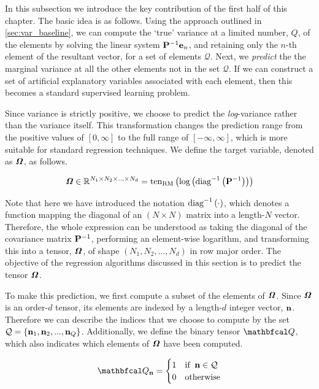 \label{sec:logvar_supervised}

In this subsection we introduce the key contribution of the first half of this chapter. The basic idea is as follows. Using the approach outlined in \cref{sec:var_baseline}, we can compute the `true' variance at a limited number, $Q$, of the elements by solving the linear system $\mathbf{P}^{-1}\mathbf{e}_n$, and retaining only the $n$-th element of the resultant vector, for a set of elements $\mathcal{Q}$. Next, we \textit{predict} the the marginal variance at all the other elements not in the set $\mathcal{Q}$. If we can construct a set of artificial explanatory variables associated with each element, then this becomes a standard supervised learning problem. 

Since variance is strictly positive, we choose to predict the \textit{log}-variance rather than the variance itself. This transformation changes the prediction range from the positive values of $[0, \infty]$ to the full range of $[-\infty, \infty]$, which is more suitable for standard regression techniques. We define the target variable, denoted as $\bm{\mathit{\Omega}}$, as follows.

\begin{equation}
    \bm{\mathit{\Omega}} \in \mathbb{R}^{N_1 \times N_2 \times ... \times N_d} = \text{\textup{ten}}_{\text{\textup{RM}}}\left(\text{log}\left(\text{\textup{diag}}^{-1}\left(\mathbf{P}^{-1}\right)\right)\right)
\end{equation}

Note that here we have introduced the notation $\text{\textup{diag}}^{-1}\left(\cdot\right)$, which denotes a function mapping the diagonal of an $(N \times N)$ matrix into a length-$N$ vector. Therefore, the whole expression can be understood as taking the diagonal of the covariance matrix $\mathbf{P}^{-1}$, performing an element-wise logarithm, and transforming this into a tensor, $\bm{\mathit{\Omega}}$,  of shape $(N_1, N_2, ..., N_d)$ in row major order. The objective of the regression algorithms discussed in this section is to predict the tensor $\bm{\mathit{\Omega}}$.

To make this prediction, we first compute a subset of the elements of $\bm{\mathit{\Omega}}$. Since $\bm{\mathit{\Omega}}$ is an order-$d$ tensor, its elements are indexed by a length-$d$ integer vector, $\mathbf{n}$. Therefore we can describe the indices that we choose to compute by the set $\mathcal{Q} = \{\mathbf{n}_1, \mathbf{n}_2, ..., \mathbf{n}_Q \}$. Additionally, we define the binary tensor $\Qt$, which also indicates which elements of $\bm{\mathit{\Omega}}$ have been computed. 

\begin{equation}
    \Qt_{\nn} = \begin{cases}
        1 & \text{if} \;\; \nn \in \mathcal{Q} \\
        0 & \text{otherwise}
    \end{cases}
\end{equation}


